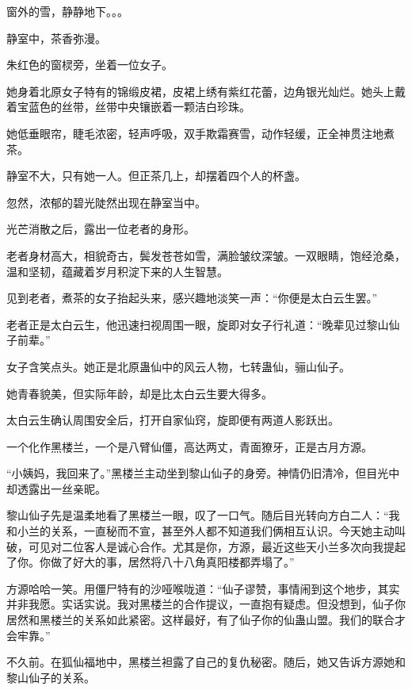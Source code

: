 
\begin{this_body}

窗外的雪，静静地下。。。

静室中，茶香弥漫。

朱红色的窗棂旁，坐着一位女子。

她身着北原女子特有的锦缎皮裙，皮裙上绣有紫红花蕾，边角银光灿烂。她头上戴着宝蓝色的丝带，丝带中央镶嵌着一颗洁白珍珠。

她低垂眼帘，睫毛浓密，轻声呼吸，双手欺霜赛雪，动作轻缓，正全神贯注地煮茶。

静室不大，只有她一人。但正茶几上，却摆着四个人的杯盏。

忽然，浓郁的碧光陡然出现在静室当中。

光芒消散之后，露出一位老者的身形。

老者身材高大，相貌奇古，鬓发苍苍如雪，满脸皱纹深皱。一双眼睛，饱经沧桑，温和坚韧，蕴藏着岁月积淀下来的人生智慧。

见到老者，煮茶的女子抬起头来，感兴趣地淡笑一声：“你便是太白云生罢。”

老者正是太白云生，他迅速扫视周围一眼，旋即对女子行礼道：“晚辈见过黎山仙子前辈。”

女子含笑点头。她正是北原蛊仙中的风云人物，七转蛊仙，骊山仙子。

她青春貌美，但实际年龄，却是比太白云生要大得多。

太白云生确认周围安全后，打开自家仙窍，旋即便有两道人影跃出。

一个化作黑楼兰，一个是八臂仙僵，高达两丈，青面獠牙，正是古月方源。

“小姨妈，我回来了。”黑楼兰主动坐到黎山仙子的身旁。神情仍旧清冷，但目光中却透露出一丝亲昵。

黎山仙子先是温柔地看了黑楼兰一眼，叹了一口气。随后目光转向方白二人：“我和小兰的关系，一直秘而不宣，甚至外人都不知道我们俩相互认识。今天她主动叫破，可见对二位客人是诚心合作。尤其是你，方源，最近这些天小兰多次向我提起了你。你做了好大的事，居然将八十八角真阳楼都弄塌了。”

方源哈哈一笑。用僵尸特有的沙哑喉咙道：“仙子谬赞，事情闹到这个地步，其实并非我愿。实话实说。我对黑楼兰的合作提议，一直抱有疑虑。但没想到，仙子你居然和黑楼兰的关系如此紧密。这样最好，有了仙子你的仙蛊山盟。我们的联合才会牢靠。”

不久前。在狐仙福地中，黑楼兰袒露了自己的复仇秘密。随后，她又告诉方源她和黎山仙子的关系。


\end{this_body}
